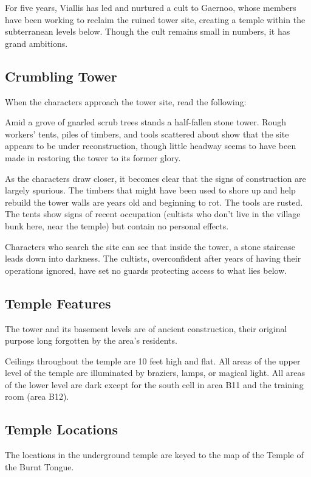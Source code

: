 \documentclass[10pt,a4paper,twoside,bg=print,twocolumn,openany,nodeprecatedcode]{dndbook}
\begin{document}
For five years, Viallis has led and nurtured a cult to Gaernoo, whose members have been working to reclaim the ruined tower site, creating a temple within the subterranean levels below. Though the cult remains small in numbers, it has grand ambitions.

\subsection{Crumbling Tower}
When the characters approach the tower site, read the following:

\begin{DndReadAloud}{}
Amid a grove of gnarled scrub trees stands a half-fallen stone tower. Rough workers' tents, piles of timbers, and tools scattered about show that the site appears to be under reconstruction, though little headway seems to have been made in restoring the tower to its former glory.

\end{DndReadAloud}

As the characters draw closer, it becomes clear that the signs of construction are largely spurious. The timbers that might have been used to shore up and help rebuild the tower walls are years old and beginning to rot. The tools are rusted. The tents show signs of recent occupation (cultists who don't live in the village bunk here, near the temple) but contain no personal effects.

Characters who search the site can see that inside the tower, a stone staircase leads down into darkness. The cultists, overconfident after years of having their operations ignored, have set no guards protecting access to what lies below.

\subsection{Temple Features}
The tower and its basement levels are of ancient construction, their original purpose long forgotten by the area's residents.

Ceilings throughout the temple are 10 feet high and flat. All areas of the upper level of the temple are illuminated by braziers, lamps, or magical light. All areas of the lower level are dark except for the south cell in area B11 and the training room (area B12).

\subsection{Temple Locations}
The locations in the underground temple are keyed to the map of the Temple of the Burnt Tongue.
\end{document}
